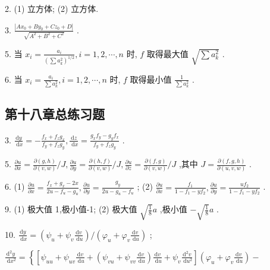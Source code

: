 2. (1) 立方体; (2) 立方体.

3. \(\frac{\left| A{x}_{0} + B{y}_{0} + C{z}_{0} + D\right| }{\sqrt{{A}^{2} + {B}^{2} + {C}^{2}}}\) .

5. 当 \({x}_{i} = \frac{{a}_{i}}{{\left( \sum {a}_{k}^{2}\right) }^{1/2}},i = 1,2,\cdots ,n\) 时, \(f\) 取得最大值 \(\sqrt{\sum {a}_{k}^{2}}\) .

6. 当 \({x}_{i} = \frac{{a}_{i}}{\sum {a}_{k}^{2}},i = 1,2,\cdots ,n\) 时, \(f\) 取得最小值 \(\frac{1}{\sum {a}_{k}^{2}}\) .

\subsection{第十八章总练习题}

3. \(\frac{\mathrm{d}y}{\mathrm{\;d}x} =  - \frac{{f}_{x} + {f}_{z}{g}_{x}}{{f}_{y} + {f}_{z}{g}_{y}},\frac{\mathrm{d}z}{\mathrm{\;d}x} = \frac{{g}_{x}{f}_{y} - {g}_{y}{f}_{x}}{{f}_{y} + {f}_{z}{g}_{y}}\) .

5. \(\frac{\partial u}{\partial x} = \frac{\partial \left( {g,h}\right) }{\partial \left( {v,w}\right) }/J,\frac{\partial u}{\partial y} = \frac{\partial \left( {h,f}\right) }{\partial \left( {v,w}\right) }/J,\frac{\partial u}{\partial z} = \frac{\partial \left( {f,g}\right) }{\partial \left( {v,w}\right) }/J\) ,其中 \(J = \frac{\partial \left( {f,g,h}\right) }{\partial \left( {u,v,w}\right) }\) .

6. (1) \(\frac{\partial u}{\partial x} = \frac{{f}_{x} + {g}_{x} - {2x}}{{2u} - {f}_{u} - {g}_{u}},\frac{\partial u}{\partial y} = \frac{{g}_{y}}{{2u} - {g}_{u} - {f}_{u}}\) ; (2) \(\frac{\partial u}{\partial x} = \frac{{f}_{1}}{1 - {f}_{1} - y{f}_{2}},\frac{\partial u}{\partial y} = \frac{u{f}_{2}}{1 - {f}_{1} - y{f}_{2}}\) .

9. (1) 极大值 1,极小值-1; (2) 极大值 \(\sqrt{\frac{1}{8}}a\) ,极小值 \(- \sqrt{\frac{1}{8}}a\) .

10. \(\frac{\mathrm{d}y}{\mathrm{\;d}x} = \left( {{\psi }_{u} + {\psi }_{v}\frac{\mathrm{d}v}{\mathrm{\;d}u}}\right) /\left( {{\varphi }_{u} + {\varphi }_{v}\frac{\mathrm{d}v}{\mathrm{\;d}u}}\right)\) ;

\(\frac{{\mathrm{d}}^{2}y}{\mathrm{\;d}{x}^{2}} = \left\{  {\left\lbrack  {{\psi }_{uu} + {\psi }_{uv}\frac{\mathrm{d}v}{\mathrm{\;d}u} + \left( {{\psi }_{vu} + {\psi }_{vv}\frac{\mathrm{d}v}{\mathrm{\;d}u}}\right) \frac{\mathrm{d}v}{\mathrm{\;d}u} + {\psi }_{v}\frac{{\mathrm{d}}^{2}v}{\mathrm{\;d}{u}^{2}}}\right\rbrack  \left( {{\varphi }_{u} + {\varphi }_{v}\frac{\mathrm{d}v}{\mathrm{\;d}u}}\right)  - }\right.\)

